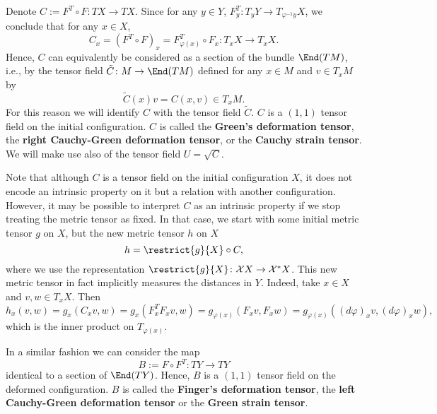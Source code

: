 \begin{discussion}
  Denote $C := F^T \circ F \colon T X \to T X$.
  Since for any $y \in Y$, $F^T_y \colon T_y Y \to T_{\varphi^{-1} y} X$,
  we conclude that for any $x \in X$,
  \begin{equation}
    C_x = (F^T \circ F)_x = F^T_{\varphi(x)} \circ F_x \colon T_x X \to T_x X.
  \end{equation}
  Hence, $C$ can equivalently be considered as a section of the bundle
  $\End(T M)$,
  i.e., by the tensor field
  $\tilde{C} \colon M \to \End(T M)$
  defined for any $x \in M$ and $v \in T_x M$ by
  \begin{equation}
    \tilde{C}(x) v = C(x, v) \in T_x M.
  \end{equation}
  For this reason we will identify $C$ with the tensor field $\tilde{C}$.
  $C$ is a $(1, 1)$ tensor field on the initial configuration.
  $C$ is called the \textbf{Green's deformation tensor}, the
  \textbf{right Cauchy-Green deformation tensor}, or the
  \textbf{Cauchy strain tensor}.
  We will make use also of the tensor field $U = \sqrt{C}$.
\end{discussion}
\begin{remark}
  Note that although $C$ is a tensor field on the initial configuration $X$,
  it does not encode an intrinsic property on it but a relation with another
  configuration.
  However, it may be possible to interpret $C$ as an intrinsic property if we
  stop treating the metric tensor as fixed.
  In that case, we start with some initial metric tensor $g$ on $X$,
  but the new metric tensor $h$ on $X$
  \begin{equation}
    h = \restrict{g}{X}  \circ C,
  \end{equation}
  where we use the representation
  $\restrict{g}{X} \colon \mathcal{X} X \to \mathcal{X}^* X$.
  This new metric tensor in fact implicitly measures the distances in $Y$.
  Indeed, take $x \in X$ and $v, w \in T_x X$.
  Then
  \begin{equation}
    h_x(v, w)
    = g_x(C_x v, w)
    = g_x(F^T_x F_x v, w)
    = g_{\varphi(x)}(F_x v, F_x w)
    = g_{\varphi(x)}((d \varphi)_x v, (d \varphi)_x w),
  \end{equation}
  which is the inner product on $T_{\varphi(x)}$.
\end{remark}
\begin{remark}
  In a similar fashion we can consider the map
  \begin{equation}
    B := F \circ F^T \colon T Y \to T Y
  \end{equation}
  identical to a section of $\End(T Y)$.
  Hence, $B$ is a $(1, 1)$ tensor field on the deformed configuration.
  $B$ is called the \textbf{Finger's deformation tensor}, the
  \textbf{left Cauchy-Green deformation tensor} or the
  \textbf{Green strain tensor}.
\end{remark}
